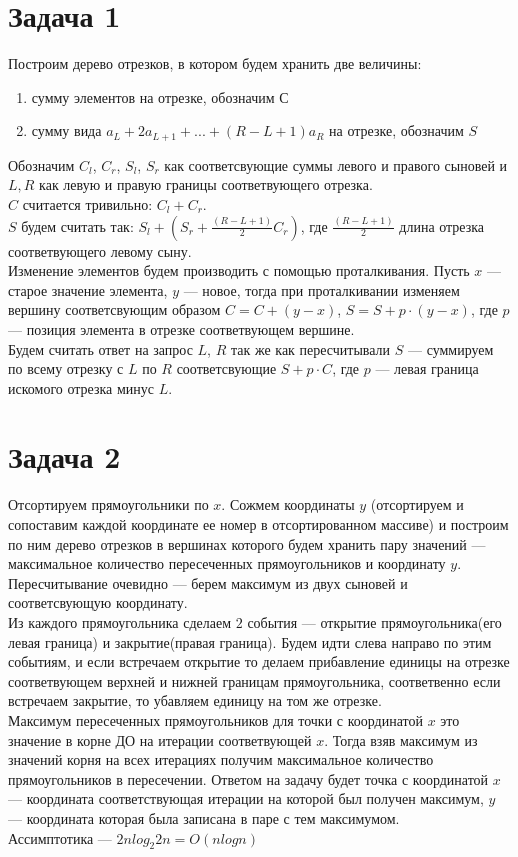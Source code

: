 \documentclass{article}
\begin{document}
 
\noindent 
\onehalfspacing  

\section{Задача 1}
Построим дерево отрезков, в котором будем хранить две величины:
\begin{enumerate}
\item сумму элементов на отрезке, обозначим $С$
\item сумму вида $a_L + 2a_{L+1} + ... + (R-L+1)a_R$ на отрезке, обозначим $S$
\end{enumerate}
Обозначим $C_l$, $C_r$, $S_l$, $S_r$ как соответсвующие суммы левого и правого сыновей и $L, R$ как левую и правую границы соответвующего отрезка.\\
$C$ считается тривильно: $C_l + C_r$.\\
$S$ будем считать так: $S_l + (S_r + \frac{(R - L + 1)}{2}C_r)$, где $\frac{(R - L + 1)}{2}$ длина отрезка соответвующего левому сыну.\\
Изменение элементов будем производить с помощью проталкивания. Пусть $x$ --- старое значение элемента, $y$ --- новое, тогда при проталкивании изменяем вершину соответсвующим образом $C=C+(y-x)$, $S=S+p\cdot(y-x)$, где $p$ --- позиция элемента в отрезке соответвующем вершине.\\
Будем считать ответ на запрос $L$, $R$ так же как пересчитывали $S$ --- суммируем по всему отрезку с $L$ по $R$ соответсвующие $S + p \cdot C$, где $p$ --- левая граница искомого отрезка минус $L$.

\section{Задача 2}
Отсортируем прямоугольники по $x$. Сожмем координаты $y$ (отсортируем и сопоставим каждой координате ее номер в отсортированном массиве) и построим по ним дерево отрезков в вершинах которого будем хранить пару значений --- максимальное количество пересеченных прямоугольников и координату $y$. Пересчитывание очевидно --- берем максимум из двух сыновей и соответсвующую координату.\\
Из каждого прямоугольника сделаем $2$ события --- открытие прямоугольника(его левая граница) и закрытие(правая граница). Будем идти слева направо по этим событиям, и если встречаем открытие то делаем прибавление единицы на отрезке соответвующем верхней и нижней границам прямоугольника, соответвенно если встречаем закрытие, то убавляем единицу на том же отрезке.\\
Максимум пересеченных прямоугольников для точки с координатой $x$ это значение в корне ДО на итерации соответвующей $x$. Тогда взяв максимум из значений корня на всех итерациях получим максимальное количество прямоугольников в пересечении. Ответом на задачу будет точка с координатой $x$ --- координата соответствующая итерации на которой был получен максимум, $y$ --- координата которая была записана в паре с тем максимумом. \\
Ассимптотика --- $2nlog_{2}{2n}=O(nlogn)$
\end{document}
